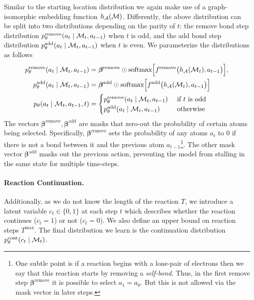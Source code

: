 Similar to the starting location distribution we again make use of a graph-isomorphic embedding function $h_{{\mathcal{A}}}({\mathcal{M}})$. Differently, the above distribution can be split into two distributions depending on the parity of $t$:
the remove bond step distribution $p_\theta^\textrm{remove}(a_t \mid  {\mathcal{M}}_t, a_{t-1})$ when $t$ is odd, 
and the add bond step distribution $p_\theta^\textrm{add}(a_t \mid {\mathcal{M}}_t, a_{t-1})$ when $t$ is even. We parameterize the distributions as follows
\begin{align}
p_\theta^\textrm{remove}(a_t \mid  {\mathcal{M}}_t, a_{t-1}) &= \bm{\beta}^\textrm{remove} \odot \mbox{softmax}\Big[f^\textrm{remove}\big(h_{{\mathcal{A}}}({\mathcal{M}}_t), a_{t-1}\big)\Big], \\
p_\theta^\textrm{add}(a_t \mid {\mathcal{M}}_t, a_{t-1}) &= \bm{\beta}^\textrm{add} \odot \mbox{softmax}\Big[f^\textrm{add}\big(h_{{\mathcal{A}}}({\mathcal{M}}_t), a_{t-1}\big)\Big] \\
p_\theta(a_t \mid {\mathcal{M}}_{t}, a_{t-1}, t) &= 
\begin{cases}
p_\theta^\textrm{remove}(a_t \mid  {\mathcal{M}}_t, a_{t-1}) & \mbox{ if } t \mbox{ is odd} \\
p_\theta^\textrm{add}(a_t \mid {\mathcal{M}}_t, a_{t-1}) & \mbox{ otherwise }
\end{cases}
\end{align}
The vectors $\bm{\beta}^\textrm{remove},\bm{\beta}^\textrm{add}$ are masks that zero-out the probability of certain atoms being selected. Specifically, $\bm{\beta}^\mathrm{remove}$ sets the probability of any atoms $a_t$ to 0 if there is not a bond between it and the previous atom $a_{t-1}$\footnote{One subtle point is if a reaction begins with a lone-pair of electrons then we say that this reaction starts by removing a \emph{self-bond}. Thus, in the first remove step $\bm{\beta}^\mathrm{remove}$ it is possible to select $a_1 \!=\! a_0$. But this is not allowed via the mask vector in later steps.}. The other mask vector $\bm{\beta}^\textrm{add}$ masks out the previous action, preventing the model from stalling in the same state for multiple time-steps. %







\paragraph{Reaction Continuation.}
Additionally, as we do not know the length of the reaction $T$, we introduce a latent variable $c_t \in \{0, 1\}$ at each step $t$ which describes whether the reaction continues ($c_t\!=\!1$) or not ($c_t\!=\!0$). We also define an upper bound on reaction steps $T^{\mathrm{max}}$. The final distribution we learn is the continuation distribution $p_\theta^\textrm{cont}(c_t \mid {\mathcal{M}}_{t})$.


